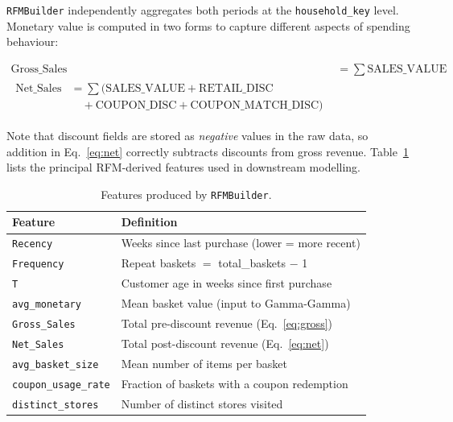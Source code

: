 \documentclass[conference]{IEEEtran}
\begin{document}
\texttt{RFMBuilder} independently aggregates both periods at the
\texttt{household\_key} level. Monetary value is computed in two
forms to capture different aspects of spending behaviour:

\begin{align}
\text{Gross\_Sales} &= \sum \text{SALES\_VALUE} \label{eq:gross} \\
\begin{split}
\text{Net\_Sales} &= \sum \bigl( \text{SALES\_VALUE} + \text{RETAIL\_DISC} \\
&\quad + \text{COUPON\_DISC} + \text{COUPON\_MATCH\_DISC} \bigr)
\end{split} \label{eq:net}
\end{align}

Note that discount fields are stored as \emph{negative} values
in the raw data, so addition in Eq.~\eqref{eq:net} correctly
subtracts discounts from gross revenue. Table~\ref{tab:rfm} lists the principal RFM-derived
features used in downstream modelling.

\begin{table}[H]
\centering
\caption{Features produced by \texttt{RFMBuilder}.}
\label{tab:rfm}
\begin{tabular}{ll}
\toprule
\textbf{Feature} & \textbf{Definition} \\
\midrule
\texttt{Recency}             & Weeks since last purchase (lower = more recent) \\
\texttt{Frequency}           & Repeat baskets $=$ total\_baskets $-$ 1         \\
\texttt{T}                   & Customer age in weeks since first purchase        \\
\texttt{avg\_monetary}       & Mean basket value (input to Gamma-Gamma)          \\
\texttt{Gross\_Sales}        & Total pre-discount revenue (Eq.~\ref{eq:gross})  \\
\texttt{Net\_Sales}          & Total post-discount revenue (Eq.~\ref{eq:net})   \\
\texttt{avg\_basket\_size}   & Mean number of items per basket                   \\
\texttt{coupon\_usage\_rate} & Fraction of baskets with a coupon redemption      \\
\texttt{distinct\_stores}    & Number of distinct stores visited                  \\
\bottomrule
\end{tabular}
\end{table}
\end{document}
